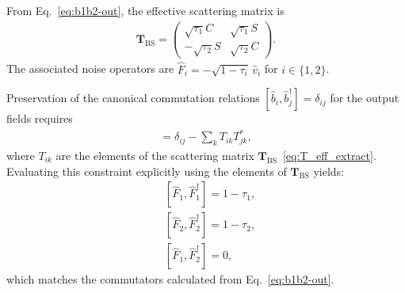 \documentclass[%
final, 
superscriptaddress,
 amsmath,amssymb,amsfonts,
 aps,
 pra,
 longbibliography,
]{revtex4-2}
\newcommand{\vc}[1]{\mathbf{#1}}
\newcommand{\ind}[1]{\mathrm{#1}}
\begin{document}
From Eq.~\eqref{eq:b1b2-out}, the effective scattering matrix is
\begin{align}
    \label{eq:T_eff_extract}
    \vc{T}_{\ind{BS}}
    =
    \begin{pmatrix}
        \sqrt{\tau_1}C & \sqrt{\tau_1}S\\
        -\sqrt{\tau_2}S & \sqrt{\tau_2}C
    \end{pmatrix}.
\end{align}
The associated noise operators are $\hat F_i=-\sqrt{1-\tau_i}\,\hat v_i$ for $i\in\{1,2\}$.

Preservation of the canonical commutation relations $[\hat{b}_i, \hat{b}_j^\dagger] = \delta_{ij}$ for the output fields requires
\begin{align}
  [\hat F_i, \hat F_j^\dagger] = \delta_{ij} - \sum_{k} T_{ik} T_{jk}^*,
\end{align}
where $T_{ik}$ are the elements of the scattering matrix $\vc{T}_{\ind{BS}}$~\eqref{eq:T_eff_extract}.
Evaluating this constraint explicitly using the elements of $\vc{T}_{\ind{BS}}$ yields:
\begin{align}
    &[\hat F_1, \hat F_1^\dagger] = %
    1-\tau_1,\\
    &[\hat F_2, \hat F_2^\dagger] = %
    1-\tau_2,\\
    &[\hat F_1, \hat F_2^\dagger] = %
    0,
\end{align}
which matches the commutators calculated from Eq.~\eqref{eq:b1b2-out}.
\end{document}
